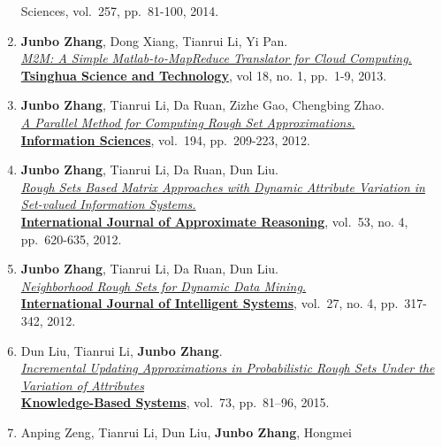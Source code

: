 \documentclass[10pt,a4paper]{article}
\begin{document}
\begin{enumerate}
{{  Sciences}}, vol.~257, pp.~81-100, 2014.
\item
  \textbf{Junbo Zhang}, Dong Xiang, Tianrui Li, Yi Pan.\\
  \href{http://ieeexplore.ieee.org/xpl/articleDetails.jsp?tp=\&arnumber=6449402\&contentType=Journals+\%26+Magazines\&queryText\%3DM2M\%3A+A+simple+Matlab-to-MapReduce+translator+for+Cloud+Computing}{\emph{M2M:
  A Simple Matlab-to-MapReduce Translator for Cloud Computing.}}\\
  \href{http://qhxb.lib.tsinghua.edu.cn/english/}{\textbf{Tsinghua
  Science and Technology}}, vol 18, no. 1, pp.~1-9, 2013.
\item
  \textbf{Junbo Zhang}, Tianrui Li, Da Ruan, Zizhe Gao, Chengbing
  Zhao.\\ \href{http://dx.doi.org/10.1016/j.ins.2011.12.036}{\emph{A
  Parallel Method for Computing Rough Set Approximations.}}\\
  \href{http://www.journals.elsevier.com/information-sciences}{\textbf{Information
  Sciences}}, vol.~194, pp.~209-223, 2012.
\item
  \textbf{Junbo Zhang}, Tianrui Li, Da Ruan, Dun Liu.\\
  \href{http://dx.doi.org/10.1016/j.ijar.2012.01.001}{\emph{Rough Sets
  Based Matrix Approaches with Dynamic Attribute Variation in Set-valued
  Information Systems.}}\\
  \href{http://www.journals.elsevier.com/international-journal-of-approximate-reasoning}{\textbf{International
  Journal of Approximate Reasoning}}, vol.~53, no. 4, pp.~620-635, 2012.
\item
  \textbf{Junbo Zhang}, Tianrui Li, Da Ruan, Dun Liu.\\
  \href{http://dx.doi.org/10.1002/int.21523}{\emph{Neighborhood Rough
  Sets for Dynamic Data Mining.}}\\
  \href{http://onlinelibrary.wiley.com/journal/10.1002/{[}ISSN{]}1098-111X}{\textbf{International
  Journal of Intelligent Systems}}, vol.~27, no. 4, pp.~317-342, 2012.
\item
  Dun Liu, Tianrui Li, \textbf{Junbo Zhang}.\\
  \href{http://dx.doi.org/10.1016/j.knosys.2014.09.008}{\emph{Incremental
  Updating Approximations in Probabilistic Rough Sets Under the
  Variation of Attributes}}\\
  \href{http://www.journals.elsevier.com/knowledge-based-systems}{\textbf{Knowledge-Based
  Systems}}, vol.~73, pp.~81--96, 2015.
\item
  Anping Zeng, Tianrui Li, Dun Liu, \textbf{Junbo Zhang}, Hongmei

\end{enumerate}
\end{document}
